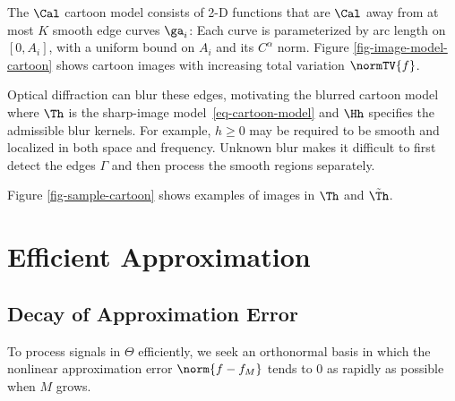 The $\Cal$ cartoon model consists of 2-D functions that are $\Cal$ away from at most $K$ smooth edge curves $\ga_i$:
Each curve is parameterized by arc length on $[0,A_i]$, with a uniform bound on $A_i$ and its $C^\alpha$ norm.
Figure \ref{fig-image-model-cartoon} shows cartoon images with increasing total variation $\normTV{f}$.


Optical diffraction can blur these edges, motivating the blurred cartoon model
where $\Th$ is the sharp-image model~\eqref{eq-cartoon-model} and $\Hh$ specifies the admissible blur kernels. For example, $h \geq 0$ may be required to be smooth and localized in both space and frequency.
Unknown blur makes it difficult to first detect the edges $\Gamma$ and then process the smooth regions separately.

Figure \ref{fig-sample-cartoon} shows examples of images in $\Th$ and $\tilde\Th$.





\section{Efficient Approximation}

\subsection{Decay of Approximation Error}
\label{sec-linear-approx-error}

To process signals in $\Theta$ efficiently, we seek an orthonormal basis in which the nonlinear approximation error $\norm{f-f_M}$ tends to $0$ as rapidly as possible when $M$ grows.


